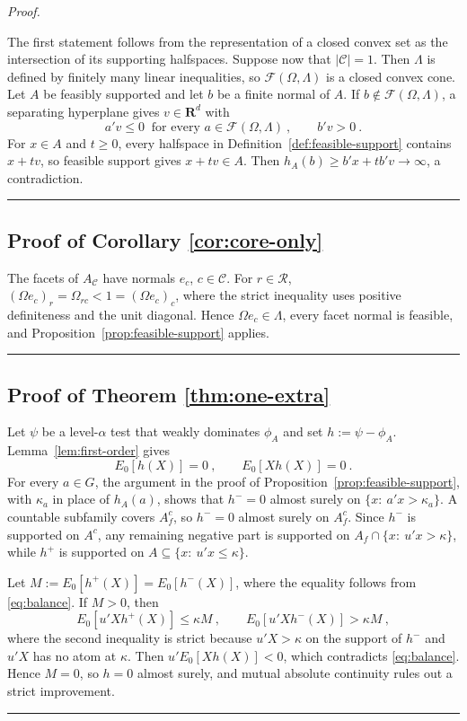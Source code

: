 \documentclass[11pt]{article}
\numberwithin{equation}{section}
\def\qed{\rule{2mm}{2mm}}
\theoremstyle{definition}
\begin{document}
\noindent\emph{Proof.}

The first statement follows from the representation of a closed convex set as the intersection of its supporting halfspaces. Suppose now that $|\mathcal C|=1$. Then $\Lambda$ is defined by finitely many linear inequalities, so $\mathcal F(\Omega,\Lambda)$ is a closed convex cone. Let $A$ be feasibly supported and let $b$ be a finite normal of $A$. If $b\notin\mathcal F(\Omega,\Lambda)$, a separating hyperplane gives $v\in\mathbf R^d$ with
\[
a'v\le0\ \text{ for every }a\in\mathcal F(\Omega,\Lambda)~,
\qquad
b'v>0~.
\]
For $x\in A$ and $t\ge0$, every halfspace in Definition~\ref{def:feasible-support} contains $x+tv$, so feasible support gives $x+tv\in A$. Then $h_A(b)\ge b'x+tb'v\to\infty$, a contradiction. \qed

\subsection{Proof of Corollary \ref{cor:core-only}}

The facets of $A_{\mathcal C}$ have normals $e_c$, $c\in\mathcal C$. For $r\in\mathcal R$, $(\Omega e_c)_r=\Omega_{rc}<1=(\Omega e_c)_c$, where the strict inequality uses positive definiteness and the unit diagonal. Hence $\Omega e_c\in\Lambda$, every facet normal is feasible, and Proposition~\ref{prop:feasible-support} applies. \qed

\subsection{Proof of Theorem \ref{thm:one-extra}}

Let $\psi$ be a level-$\alpha$ test that weakly dominates $\phi_A$ and set $h:=\psi-\phi_A$. Lemma~\ref{lem:first-order} gives
\begin{equation}\label{eq:balance}
E_0[h(X)]=0~,
\qquad
E_0[Xh(X)]=0~.
\end{equation}
For every $a\in G$, the argument in the proof of Proposition~\ref{prop:feasible-support}, with $\kappa_a$ in place of $h_A(a)$, shows that $h^-=0$ almost surely on $\{x:\ a'x>\kappa_a\}$. A countable subfamily covers $A_f^c$, so $h^-=0$ almost surely on $A_f^c$. Since $h^-$ is supported on $A^c$, any remaining negative part is supported on $A_f\cap\{x:\ u'x>\kappa\}$, while $h^+$ is supported on $A\subseteq\{x:\ u'x\le\kappa\}$.

Let $M:=E_0[h^+(X)]=E_0[h^-(X)]$, where the equality follows from \eqref{eq:balance}. If $M>0$, then
\[
E_0[u'Xh^+(X)]\le\kappa M~,
\qquad
E_0[u'Xh^-(X)]>\kappa M~,
\]
where the second inequality is strict because $u'X>\kappa$ on the support of $h^-$ and $u'X$ has no atom at $\kappa$. Then $u'E_0[Xh(X)]<0$, which contradicts \eqref{eq:balance}. Hence $M=0$, so $h=0$ almost surely, and mutual absolute continuity rules out a strict improvement. \qed
\end{document}
